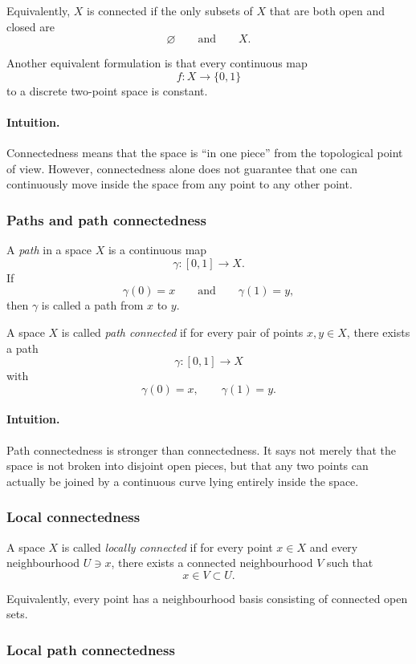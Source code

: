 \documentclass[12pt,a4paper]{article}
\theoremstyle{notespace}
\begin{document}
Equivalently, \(X\) is connected if the only subsets of \(X\) that are both open and closed are
\[
\varnothing
\qquad\text{and}\qquad
X.
\]

Another equivalent formulation is that every continuous map
\[
f:X\to \{0,1\}
\]
to a discrete two-point space is constant.

\paragraph{Intuition.}
Connectedness means that the space is ``in one piece'' from the topological point of view. However, connectedness alone does not guarantee that one can continuously move inside the space from any point to any other point.

\subsubsection{Paths and path connectedness}

A \emph{path} in a space \(X\) is a continuous map
\[
\gamma:[0,1]\to X.
\]
If
\[
\gamma(0)=x
\qquad\text{and}\qquad
\gamma(1)=y,
\]
then \(\gamma\) is called a path from \(x\) to \(y\).

A space \(X\) is called \emph{path connected} if for every pair of points \(x,y\in X\), there exists a path
\[
\gamma:[0,1]\to X
\]
with
\[
\gamma(0)=x,
\qquad
\gamma(1)=y.
\]

\paragraph{Intuition.}
Path connectedness is stronger than connectedness. It says not merely that the space is not broken into disjoint open pieces, but that any two points can actually be joined by a continuous curve lying entirely inside the space.

\subsubsection{Local connectedness}

A space \(X\) is called \emph{locally connected} if for every point \(x\in X\) and every neighbourhood \(U\ni x\), there exists a connected neighbourhood \(V\) such that
\[
x\in V\subset U.
\]

Equivalently, every point has a neighbourhood basis consisting of connected open sets.

\subsubsection{Local path connectedness}
\end{document}
